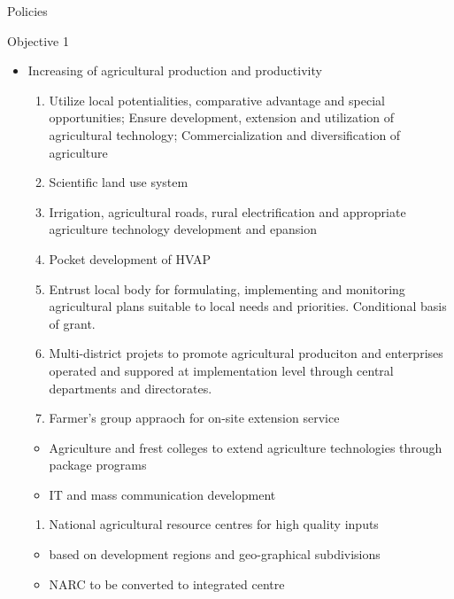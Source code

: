 \documentclass[
  openany]{book}
\providecommand{\tightlist}{%
  \setlength{\itemsep}{0pt}\setlength{\parskip}{0pt}}
\begin{document}
Policies

Objective 1

\begin{itemize}
\tightlist
\item
  Increasing of agricultural production and productivity

  \begin{enumerate}
  \def\labelenumi{\arabic{enumi}.}
  \tightlist
  \item
    Utilize local potentialities, comparative advantage and special opportunities; Ensure development, extension and utilization of agricultural technology; Commercialization and diversification of agriculture
  \item
    Scientific land use system
  \item
    Irrigation, agricultural roads, rural electrification and appropriate agriculture technology development and epansion
  \item
    Pocket development of HVAP
  \item
    Entrust local body for formulating, implementing and monitoring agricultural plans suitable to local needs and priorities. Conditional basis of grant.
  \item
    Multi-district projets to promote agricultural produciton and enterprises operated and suppored at implementation level through central departments and directorates.
  \item
    Farmer's group appraoch for on-site extension service
  \end{enumerate}

  \begin{itemize}
  \tightlist
  \item
    Agriculture and frest colleges to extend agriculture technologies through package programs
  \item
    IT and mass communication development
  \end{itemize}

  \begin{enumerate}
  \def\labelenumi{\arabic{enumi}.}
  \setcounter{enumi}{7}
  \tightlist
  \item
    National agricultural resource centres for high quality inputs
  \end{enumerate}

  \begin{itemize}
  \tightlist
  \item
    based on development regions and geo-graphical subdivisions
  \item
    NARC to be converted to integrated centre
  \end{itemize}


\end{itemize}
\end{document}
